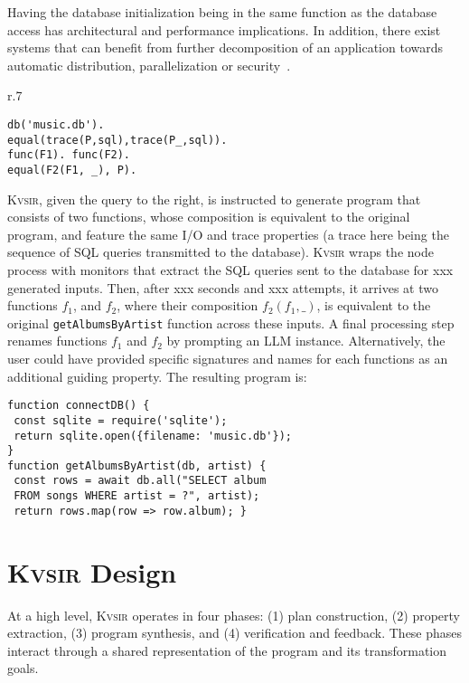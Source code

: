 \documentclass[sigplan]{acmart}
\newcommand{\sys}{{\scshape Kv{\textalpha}sir}\xspace}
\newcommand{\heading}[1]{\vspace{2pt}\noindent\textbf{\emph{#1}}:\enspace}
\newcommand{\ttt}[1]{\texttt{#1}}
\newcommand{\xxx}{\colorbox{red!30}{xxx}\xspace}
\begin{document}
Having the database initialization being in the same function as 
the database access has architectural and performance implications.
In addition, there exist systems that can benefit from further decomposition
of an application towards automatic distribution, parallelization or security~\cite{Towards_Modern_Ghemaw_2023, vasilakis2019ignis, vasilakis2018breakapp}.
\begin{wrapfigure}[5]{r}{.7\columnwidth}
  \vspace{-10pt}
  \begin{verbatim}
db('music.db').
equal(trace(P,sql),trace(P_,sql)).
func(F1). func(F2).
equal(F2(F1, _), P).
\end{verbatim}
\end{wrapfigure}
\sys, given the query to the right, is instructed 
to generate program that consists of two functions,
whose composition is equivalent to the original program, and feature 
the same I/O and trace properties (a trace here being the sequence of SQL 
queries transmitted to the database).
\sys wraps the node process with monitors that extract the SQL queries 
sent to the database for \xxx generated inputs.
Then, after \xxx seconds and \xxx attempts, it arrives at two functions $f_1$, and 
$f_2$, where their composition $f_2(f_1, \_)$, is equivalent to the original \ttt{getAlbumsByArtist} function across these inputs.
A final processing step renames functions $f_1$ and $f_2$ by prompting an LLM instance.
Alternatively, the user could have provided specific signatures and names for each 
functions as an additional guiding property.
The resulting program is:
\begin{verbatim}
function connectDB() {
 const sqlite = require('sqlite');
 return sqlite.open({filename: 'music.db'}); 
}
function getAlbumsByArtist(db, artist) {
 const rows = await db.all("SELECT album
 FROM songs WHERE artist = ?", artist);
 return rows.map(row => row.album); }
\end{verbatim}


\section{\sys Design}
\label{sec:design}

At a high level, \sys operates in four phases: (1) plan construction, (2)
property extraction, (3) program synthesis, and (4) verification and feedback.
These phases interact through a shared representation of the program and its
transformation goals.
\end{document}
